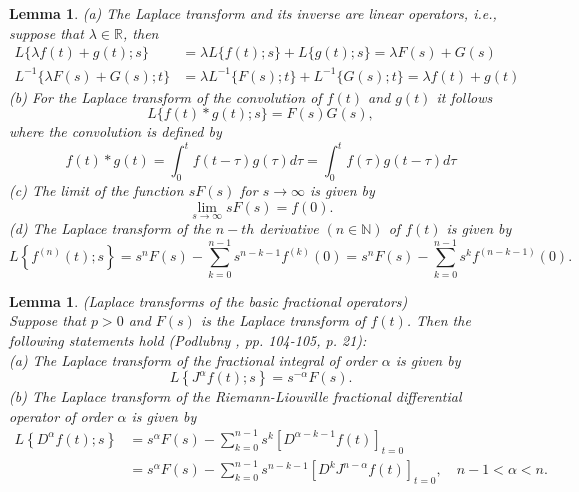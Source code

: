\documentclass[a4paper,14pt,oneside]{book}
\theoremstyle{plain}
\newtheorem{lem}[thm]{Lemma}
\theoremstyle{definition}
\theoremstyle{remark}
\begin{document}
\begin{center}
\begin{flushleft}
{\begin{lem}
(a) The Laplace transform and its inverse are linear operators, i.e., suppose that $\lambda \in \mathbb{R}$, then
\begin{equation}\label{4.13}
\begin{aligned}
L\{\lambda f(t)+g(t) ; s\} &=\lambda L\{f(t) ; s\}+L\{g(t) ; s\}=\lambda F(s)+G(s) \\
L^{-1}\{\lambda F(s)+G(s) ; t\} &=\lambda L^{-1}\{F(s) ; t\}+L^{-1}\{G(s) ; t\}=\lambda f(t)+g(t)
\end{aligned}
\end{equation}
(b) For the Laplace transform of the convolution of $f(t)$ and $g(t)$ it follows
\begin{equation}\label{4.14}
L\{f(t) * g(t) ; s\}=F(s) G(s),
\end{equation}
where the convolution is defined by
$$
f(t) * g(t)=\int_{0}^{t} f(t-\tau) g(\tau) d \tau=\int_{0}^{t} f(\tau) g(t-\tau) d \tau
$$
(c) The limit of the function $s F(s)$ for $s \rightarrow \infty$ is given by
\begin{equation}\label{4.15}
\lim _{s \rightarrow \infty} s F(s)=f(0) .
\end{equation}
(d) The Laplace transform of the $n-t h$ derivative $(n \in \mathbb{N})$ of $f(t)$ is given by
\begin{equation}\label{4.16}
L\left\{f^{(n)}(t) ; s\right\}=s^{n} F(s)-\sum_{k=0}^{n-1} s^{n-k-1} f^{(k)}(0)=s^{n} F(s)-\sum_{k=0}^{n-1} s^{k} f^{(n-k-1)}(0) .
\end{equation}
\end{lem}
\begin{lem}(Laplace transforms of the basic fractional operators)\\
Suppose that $p>0$ and $F(s)$ is the Laplace transform of $f(t)$. Then the following statements hold (Podlubny \cite{bb22}, pp. 104-105, p. 21):\\
(a) The Laplace transform of the fractional integral of order $\alpha$ is given by
\begin{equation}\label{4.17}
L\left\{J^{\alpha} f(t) ; s\right\}=s^{-\alpha} F(s) .
\end{equation}
(b) The Laplace transform of the Riemann-Liouville fractional differential operator of order $\alpha$ is given by
\begin{equation}\label{4.18}
\begin{aligned}
L\left\{D^{\alpha} f(t) ; s\right\} &=s^{\alpha} F(s)-\sum_{k=0}^{n-1} s^{k}\left[D^{\alpha-k-1} f(t)\right]_{t=0} \\
&=s^{\alpha} F(s)-\sum_{k=0}^{n-1} s^{n-k-1}\left[D^{k} J^{n-\alpha} f(t)\right]_{t=0}, \quad n-1<\alpha<n .

\end{aligned}
\end{equation}
\end{lem}}
\end{flushleft}
\end{center}
\end{document}
